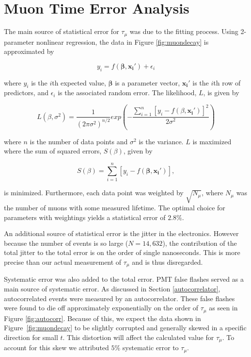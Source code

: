 
\section{Muon Time Error Analysis}\label{muontimeerroranalysis}

The main source of statistical error for $\tau_{\mu}$ was due to the fitting process.  Using 2-parameter nonlinear regression, the data in Figure \ref{fig:muondecay} is approximated by \cite{bates}

\begin{equation}
\label{nonlinfit}
y_{i}=f(\mathbf{\beta},\mathbf{x_{i}'})+\epsilon_{i}
\end{equation}

where $y_{i}$ is the $i$th expected value, $\mathbf{\beta}$ is a parameter vector, $\mathbf{x_{i}'}$ is the $i$th row of predictors, and $\epsilon_{i}$ is the associated random error.  The likelihood, $L$, is given by \cite{bates}

\begin{equation}
\label{likelihood}
L(\beta,\sigma^{2})=\frac{1}{(2\pi\sigma^{2})^{n/2}}exp(-\frac{\sum_{i=1}^{n}[y_{i}-f(\beta,\mathbf{x_{i}'})]^{2}}{2\sigma^{2}})
\end{equation}

where $n$ is the number of data points and $\sigma^{2}$ is the variance. $L$ is maximized where the sum of squared errors, $S(\beta)$, given by \cite{bates}

\begin{equation}
\label{sse}
S(\beta) = \sum_{i=1}^{n}[y_{i}-f(\mathbf{\beta},\mathbf{x_{i}'})],
\end{equation}

is minimized.  Furthermore, each data point was weighted by $\sqrt{N_{\mu}}$, where $N_{\mu}$ was the number of muons with some measured lifetime.  The optimal choice for parameters with weightings yields a statistical error of $2.8\%$.  

An additional source of statistical error is the jitter in the electronics.  However because the number of events is so large ($N=14,632$), the contribution of the total jitter to the total error is on the order of single nanoseconds.  This is more precise than our actual measurement of $\tau_{\mu}$ and is thus disregarded.
 
Systematic error was also added to the total error.  PMT false flashes served as a main source of systematic error.  As discussed in Section \ref{autocorrelator}, autocorrelated events were measured by an autocorrelator. These false flashes were found to die off approximately exponentially on the order of $\tau_{\mu}$ as seen in Figure \ref{fig:autocorr}.  Because of this, we expect the data shown in Figure~\ref{fig:muondecay} to be slightly corrupted and generally skewed in a specific direction for small $t$.  This distortion will affect the calculated value for $\tau_{\mu}$.  To account for this skew we attributed $5\%$ systematic error to $\tau_{\mu}$.

